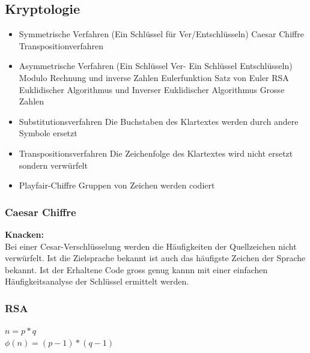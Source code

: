 \subsection{Kryptologie}
\begin{itemize}
	\item Symmetrische Verfahren (Ein Schlüssel für Ver/Entschlüsseln)
		\subitem Caesar Chiffre
		\subitem Transpositionverfahren
	\item Asymmetrische Verfahren (Ein Schlüssel Ver- Ein Schlüssel Entschlüsseln)
		\subitem Modulo Rechnung und inverse Zahlen
		\subitem Eulerfunktion
		\subitem Satz von Euler
		\subitem RSA
		\subitem Euklidischer Algorithmus und Inverser Euklidischer Algorithmus
		\subitem Grosse Zahlen
	\item Substitutionsverfahren
		\subitem Die Buchstaben des Klartextes werden durch andere Symbole ersetzt
	\item Transpositionsverfahren
		\subitem Die Zeichenfolge des Klartextes wird nicht ersetzt sondern verwürfelt
	\item Playfair-Chiffre
		\subitem Gruppen von Zeichen werden codiert
\end{itemize}

\subsubsection{Caesar Chiffre}
\textbf{Knacken: } \\
Bei einer Cesar-Verschlüsselung werden die Häufigkeiten der Quellzeichen nicht verwürfelt. Ist die Zielsprache bekannt ist auch das häufigste Zeichen der Sprache bekannt. Ist der Erhaltene Code gross genug kannn mit einer einfachen Häufigkeitsanalyse der Schlüssel ermittelt werden.


\subsubsection{RSA}
$n=p*q$ \\
$\phi(n)=(p-1)*(q-1)$ \\



